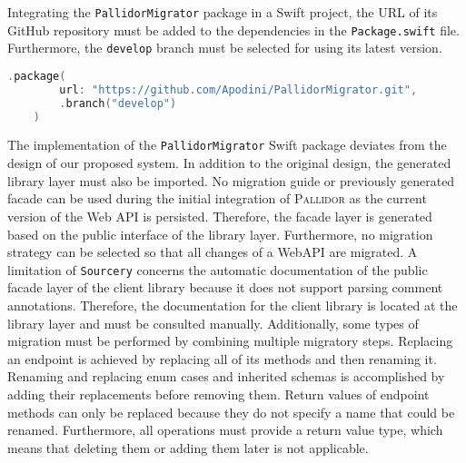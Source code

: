 Integrating the \texttt{PallidorMigrator} package in a Swift project, the URL of its GitHub repository must be added to the dependencies in the \texttt{Package.swift} file. Furthermore, the \texttt{develop} branch must be selected for using its latest version.

\begin{lstlisting}[language=Swift, caption={Integrating PallidorMigrator in SPM}, captionpos=b, label={lst:IntegrationMigrator}]
	.package(
		url: "https://github.com/Apodini/PallidorMigrator.git", 
		.branch("develop")
	)
\end{lstlisting}

The implementation of the \texttt{PallidorMigrator} Swift package deviates from the design of our proposed system. In addition to the original design, the generated library layer must also be imported. No migration guide or previously generated facade can be used during the initial integration of \textsc{Pallidor} as the current version of the Web API is persisted. Therefore, the facade layer is generated based on the public interface of the library layer. Furthermore, no migration strategy can be selected so that all changes of a WebAPI are migrated. A limitation of \texttt{Sourcery} concerns the automatic documentation of the public facade layer of the client library because it does not support parsing comment annotations. Therefore, the documentation for the client library is located at the library layer and must be consulted manually. Additionally, some types of migration must be performed by combining multiple migratory steps. Replacing an endpoint is achieved by replacing all of its methods and then renaming it. Renaming and replacing enum cases and inherited schemas is accomplished by adding their replacements before removing them. Return values of endpoint methods can only be replaced because they do not specify a name that could be renamed. Furthermore, all operations must provide a return value type, which means that deleting them or adding them later is not applicable.